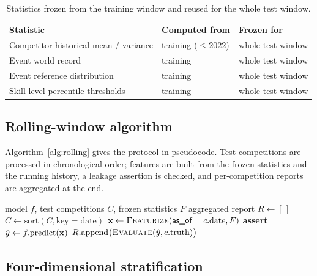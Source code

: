 \begin{table}[t]
  \centering
  \small
  \begin{threeparttable}
  \caption{Statistics frozen from the training window and reused for the whole
  test window.}
  \label{tab:frozen}
  \begin{tabular}{@{}lll@{}}
    \toprule
    Statistic & Computed from & Frozen for \\
    \midrule
    Competitor historical mean / variance & training ($\le 2022$) & whole test window \\
    Event world record & training & whole test window \\
    Event reference distribution & training & whole test window \\
    Skill-level percentile thresholds & training & whole test window \\
    \bottomrule
  \end{tabular}
  \end{threeparttable}
\end{table}

\subsection{Rolling-window algorithm}
\label{sec:protocol-algorithm}

Algorithm~\ref{alg:rolling} gives the protocol in pseudocode. Test competitions
are processed in chronological order; features are built from the frozen
statistics and the running history, a leakage assertion is checked, and
per-competition reports are aggregated at the end.

\begin{algorithm}[t]
\caption{Rolling-window evaluation with frozen statistics.}
\label{alg:rolling}
\begin{algorithmic}[1]
\Require model $f$, test competitions $C$, frozen statistics $F$
\Ensure aggregated report
\State $R \gets [\,]$
\State $C \gets \mathrm{sort}(C, \text{key} = \text{date})$ 
    \State $\mathbf{x} \gets \textsc{Featurize}(\textsf{as\_of} = c.\text{date}, F)$
    \State \textbf{assert} 
    \State $\hat{y} \gets f.\mathrm{predict}(\mathbf{x})$
    \State $R.\mathrm{append}\big(\textsc{Evaluate}(\hat{y}, c.\text{truth})\big)$
\EndFor
\State \Return {}
\end{algorithmic}
\end{algorithm}

\subsection{Four-dimensional stratification}
\label{sec:protocol-stratification}

